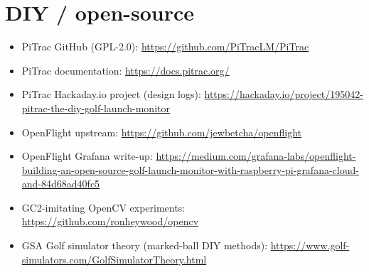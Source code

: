 \section{DIY / open-source}
\begin{itemize}\small
\item PiTrac GitHub (GPL-2.0): \url{https://github.com/PiTracLM/PiTrac}
\item PiTrac documentation: \url{https://docs.pitrac.org/}
\item PiTrac Hackaday.io project (design logs):
  \url{https://hackaday.io/project/195042-pitrac-the-diy-golf-launch-monitor}
\item OpenFlight upstream: \url{https://github.com/jewbetcha/openflight}
\item OpenFlight Grafana write-up:
  \url{https://medium.com/grafana-labs/openflight-building-an-open-source-golf-launch-monitor-with-raspberry-pi-grafana-cloud-and-84d68ad40fc5}
\item GC2-imitating OpenCV experiments:
  \url{https://github.com/ronheywood/opencv}
\item GSA Golf simulator theory (marked-ball DIY methods):
  \url{https://www.golf-simulators.com/GolfSimulatorTheory.html}
\end{itemize}

